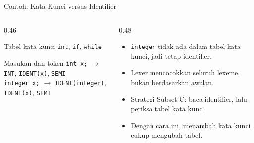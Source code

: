 \documentclass[aspectratio=169,10pt,t]{beamer}
\begin{document}
\begin{frame}{Contoh: Kata Kunci versus Identifier}
  \begin{columns}[T,onlytextwidth]
    \begin{column}{0.46\textwidth}
      \begin{block}{Tabel kata kunci}
        \centering
        \texttt{int}, \texttt{if}, \texttt{while}
      \end{block}
      \begin{exampleblock}{Masukan dan token}
        \footnotesize
        \texttt{int x;} $\rightarrow$ \texttt{INT},
        \texttt{IDENT(x)}, \texttt{SEMI}\\
        \texttt{integer x;} $\rightarrow$ \texttt{IDENT(integer)},
        \texttt{IDENT(x)}, \texttt{SEMI}
      \end{exampleblock}
    \end{column}
    \begin{column}{0.48\textwidth}
      \begin{itemize}
        \item \texttt{integer} tidak ada dalam tabel kata kunci, jadi
              tetap identifier.
        \item Lexer mencocokkan seluruh lexeme, bukan berdasarkan
              awalan.
        \item Strategi Subset-C: baca identifier, lalu periksa tabel
              kata kunci.
        \item Dengan cara ini, menambah kata kunci cukup mengubah tabel.
      \end{itemize}
    \end{column}
  \end{columns}
\end{frame}
\end{document}
